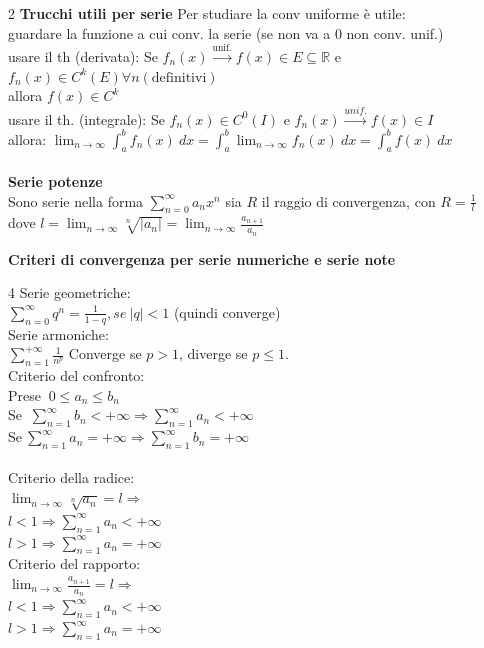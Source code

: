 \documentclass[a4paper, oneside]{article}
\newcommand{\tab}{\hspace*{2em}}
\begin{document}
    \begin{multicols}{2}
        \noindent
        \textbf{Trucchi utili per serie}\tab
        Per studiare la conv uniforme è utile: \\guardare la funzione a cui conv. la serie (se non va a 0 non conv. unif.)\\ usare il th (derivata): Se $f_n(x) \overset{\text{unif.}}{\to} f(x) \in E \subseteq \mathbb{R}$ e $f_n(x) \in C^k(E) \forall n (\text{definitivi})$ \\allora $f(x) \in C^k$\\
        usare il th. (integrale): Se $f_n(x) \in C^0(I)$ e $f_n(x) \overset{unif.}{\to} f(x) \in I$ \\allora: $\lim_{n\to \infty} \int_{a}^{b}f_n(x) \ dx = \int_{a}^{b} \lim_{n\to\infty}f_n(x) \ dx = \int_{a}^{b} f(x) \ dx$\\
        \columnbreak\\
        \textbf{Serie potenze}\\
        Sono serie nella forma $\sum_{n=0}^{\infty} a_n x^n$ sia $R$ il raggio di convergenza, con $R=\frac{1}{l}$\\ dove $l = \lim_{n\to\infty} \sqrt[n]{|a_n|} = \lim_{n \to \infty} \frac{a_{n+1}}{a_n}$\\
    \end{multicols}    
    \noindent
    \textbf{Criteri di convergenza per serie numeriche e serie note}\\
    \begin{multicols}{4}
        \noindent
    Serie geometriche:\\
        $\sum_{n = 0}^{\infty } q^{n} = \frac{1}{1-q}, se \ |q| < 1$ (quindi converge)\\
    Serie armoniche:\\
        $\sum_{n = 1}^{+\infty } \frac{1}{n^{p}}$
    Converge se $p > 1$, diverge se $p \leq 1$.
    \columnbreak\\
    Criterio del confronto:\\
        Prese $\ 0 \leq a_n \leq b_n$ \\
        Se $\ \sum_{n = 1}^{\infty } b_n < + \infty \Rightarrow \sum_{n = 1}^{\infty } a_n < + \infty $\\
        Se$ \   \sum_{n = 1}^{\infty } a_n = + \infty \Rightarrow \sum_{n = 1}^{\infty } b_n = + \infty $\\
    \columnbreak\\
    Criterio della radice:\\
        $\lim_{n \to \infty } \sqrt[n]{a_n} = l  \Rightarrow $ \\
       $ l < 1 \Rightarrow  \sum_{n = 1}^{\infty }a_n < + \infty $\\
        $l > 1 \Rightarrow  \sum_{n = 1}^{\infty } a_n = + \infty $
    \columnbreak\\
    Criterio del rapporto:\\
        $\lim_{n \to \infty} \frac{a_{n + 1}}{a_n} = l \Rightarrow$ \\
        $l < 1 \Rightarrow  \sum_{n = 1}^{\infty }a_n < + \infty $\\
        $l > 1 \Rightarrow  \sum_{n = 1}^{\infty } a_n = + \infty $    
    \end{multicols}
\end{document}
